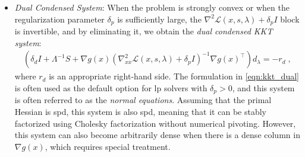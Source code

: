 \documentclass{article}
\begin{document}
\begin{itemize}[leftmargin=*,itemsep=0pt,parsep=0pt,partopsep=0pt]
\item \textit{Dual Condensed System}:
When the problem is strongly convex or when the regularization parameter \(\delta_p\) is sufficiently large, the \(\nabla^2 \mathcal{L}(x,s,\lambda) + \delta_p I\) block is invertible, and by eliminating it, we obtain the \emph{dual condensed KKT system}:
\begin{align}\label{eqn:kkt_dual}
  \left(\delta_d I + \Lambda^{-1}S + \nabla g(x)\left(\nabla_{xx}^2 \mathcal{L}(x,s,\lambda) + \delta_p I\right)^{-1} \nabla g(x)^\top\right)
  d_\lambda = - r_d \; ,
\end{align}
where \(r_d\) is an appropriate right-hand side. The formulation in \eqref{eqn:kkt_dual} is often used as the default option for \gls*{lp} solvers with \(\delta_p>0\), and this system is often referred to as the \emph{normal equations}. Assuming that the primal Hessian is \gls*{spd}, this system is also \gls*{spd}, meaning that it can be stably factorized using Cholesky factorization without numerical pivoting. However, this system can also become arbitrarily dense when there is a dense column in \(\nabla g(x)\), which requires special treatment.
\end{itemize}
\end{document}
